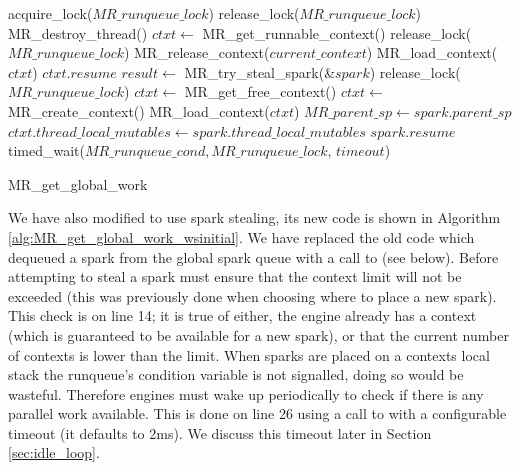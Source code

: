 \begin{algorithm}
\begin{algorithmic}[1]
  \State acquire\_lock($MR\_runqueue\_lock$)
  \Loop
      \State release\_lock($MR\_runqueue\_lock$)
      \State MR\_destroy\_thread()
    \EndIf
    \State $ctxt \gets$ MR\_get\_runnable\_context()
      \State release\_lock($MR\_runqueue\_lock$)
        \State MR\_release\_context($current\_context$)
      \EndIf
      \State MR\_load\_context($ctxt$)
      \Goto $ctxt.resume$
    \EndIf
      \State $result \gets$ MR\_try\_steal\_spark(\&$spark$)
        \State release\_lock($MR\_runqueue\_lock$)
          \State $ctxt \gets$ MR\_get\_free\_context()
            \State $ctxt \gets$ MR\_create\_context()
          \EndIf
          \State MR\_load\_context($ctxt$)
        \EndIf
        \State $MR\_parent\_sp \gets spark.parent\_sp$
        \State $ctxt.thread\_local\_mutables \gets
          spark.thread\_local\_mutables$
        \Goto $spark.resume$
      \EndIf
    \EndIf
    \State timed\_wait($MR\_runqueue\_cond, MR\_runqueue\_lock$, $timeout$)
  \EndLoop
\EndProcedure
\end{algorithmic}
\caption{MR\_get\_global\_work}
\label{alg:MR_get_global_work_wsinitial}
\end{algorithm}

We have also modified \getglobalwork to use spark stealing,
its new code is shown in Algorithm \ref{alg:MR_get_global_work_wsinitial}.
We have replaced the old code which dequeued a spark from the global spark
queue
with a call to \trystealspark (see below).
Before attempting to steal a spark \getglobalwork must ensure that the context limit
will not be exceeded
(this was previously done when choosing where to place a new spark).
This check is on line 14; it is true of either,
the engine already has a context (which is guaranteed to be available for a
new spark), 
or that the current number of contexts is lower than the limit.
When sparks are placed on a contexts local stack the runqueue's condition
variable is not signalled,
doing so would be wasteful.
Therefore engines must wake up periodically to check if there is any
parallel work available.
This is done on line 26 using a call to  with a
configurable timeout (it defaults to 2ms).
We discuss this timeout later in Section \ref{sec:idle_loop}.

